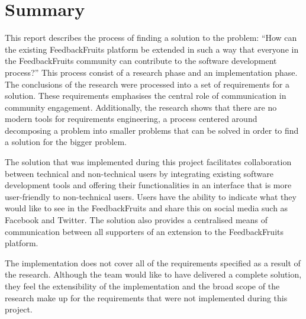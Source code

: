 \chapter*{Summary}

This report describes the process of finding a solution to the problem: ``How can the existing FeedbackFruits platform be extended in such a way that everyone in the FeedbackFruits community can contribute to the software development process?'' This process consist of a research phase and an implementation phase. The conclusions of the research were processed into a set of requirements for a solution. These requirements emphasises the central role of communication in community engagement. Additionally, the research shows that there are no modern tools for requirements engineering, a process centered around decomposing a problem into smaller problems that can be solved in order to find a solution for the bigger problem.

The solution that was implemented during this project facilitates collaboration between technical and non-technical users by integrating existing software development tools and offering their functionalities in an interface that is more user-friendly to non-technical users. Users have the ability to indicate what they would like to see in the FeedbackFruits and share this on social media such as Facebook and Twitter. The solution also provides a centralised means of communication between all supporters of an extension to the FeedbackFruits platform.

The implementation does not cover all of the requirements specified as a result of the research. Although the team would like to have delivered a complete solution, they feel the extensibility of the implementation and the broad scope of the research make up for the requirements that were not implemented during this project.
